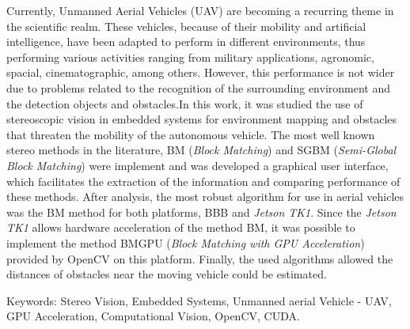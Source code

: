 \vspace{0.05\textheight}

Currently, Unmanned Aerial Vehicles (UAV) are becoming a recurring theme in the scientific realm. These vehicles, because of their mobility and artificial intelligence, have been adapted to perform in different environments, thus performing various activities ranging from
military applications, agronomic, spacial, cinematographic, among others. However, this performance is not wider due to  problems related to the recognition of the surrounding environment and the detection objects and obstacles.In this work, it was studied the use of stereoscopic vision in embedded systems for environment mapping and obstacles that threaten the mobility of the autonomous vehicle. The most well known stereo methods in the literature, BM (\textit{Block Matching}) and SGBM (\textit{Semi-Global Block Matching}) were implement and was developed a graphical user interface, which facilitates the extraction of the information and comparing performance of these methods. After analysis, the most robust algorithm for use in aerial vehicles was the BM method for both platforms, BBB and \textit{Jetson TK1}. Since the \textit{Jetson TK1} allows hardware acceleration of the method BM, it was possible to implement the method BMGPU (\textit{Block Matching with GPU Acceleration}) provided by OpenCV on this platform. Finally, the used algorithms allowed the distances of obstacles near the moving vehicle could be estimated.

\vspace{0.05\textheight}

Keywords: Stereo Vision, Embedded Systems, Unmanned aerial Vehicle - UAV, GPU Acceleration, Computational Vision, OpenCV, CUDA.

\cleardoublepage

\listoffigures %

\listoftables %

\cleardoublepage

\vspace{0.11\textheight} 

